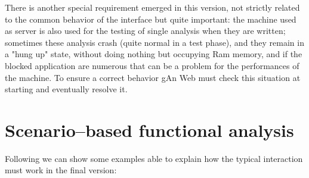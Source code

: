 There is another special requirement emerged in this version, not strictly related to the common behavior of the interface but quite important: the machine  used as server is also used for the testing of single analysis when they are written; sometimes these analysis crash (quite normal in a test phase), and they remain in a "hung up" state, without doing nothing but occupying Ram memory, and if the blocked application are numerous that can be a problem for the performances of the machine. To ensure a correct behavior gAn Web must check this situation at starting and eventually resolve it.

\section{Scenario--based functional analysis}
Following we can show some examples able to explain how the typical interaction must work in the final version:

